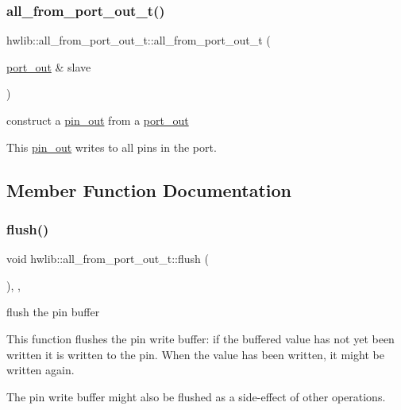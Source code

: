 \subsubsection{\texorpdfstring{all\+\_\+from\+\_\+port\+\_\+out\+\_\+t()}{all\_from\_port\_out\_t()}}
{\footnotesize\ttfamily hwlib\+::all\+\_\+from\+\_\+port\+\_\+out\+\_\+t\+::all\+\_\+from\+\_\+port\+\_\+out\+\_\+t (\begin{DoxyParamCaption}\item[{\hyperlink{classhwlib_1_1port__out}{port\+\_\+out} \&}]{slave }\end{DoxyParamCaption})\hspace{0.3cm}{\ttfamily [inline]}}

construct a \hyperlink{classhwlib_1_1pin__out}{pin\+\_\+out} from a \hyperlink{classhwlib_1_1port__out}{port\+\_\+out}

This \hyperlink{classhwlib_1_1pin__out}{pin\+\_\+out} writes to all pins in the port. 

\subsection{Member Function Documentation}
\mbox{\label{classhwlib_1_1all__from__port__out__t_aa98ee6cecc0f87b153f5aea8b2967f21}} 
\subsubsection{\texorpdfstring{flush()}{flush()}}
{\footnotesize\ttfamily void hwlib\+::all\+\_\+from\+\_\+port\+\_\+out\+\_\+t\+::flush (\begin{DoxyParamCaption}{ }\end{DoxyParamCaption})\hspace{0.3cm}{\ttfamily [inline]}, {\ttfamily [override]}, {\ttfamily [virtual]}}





flush the pin buffer

This function flushes the pin write buffer\+: if the buffered value has not yet been written it is written to the pin. When the value has been written, it might be written again.

The pin write buffer might also be flushed as a side-\/effect of other operations. 

